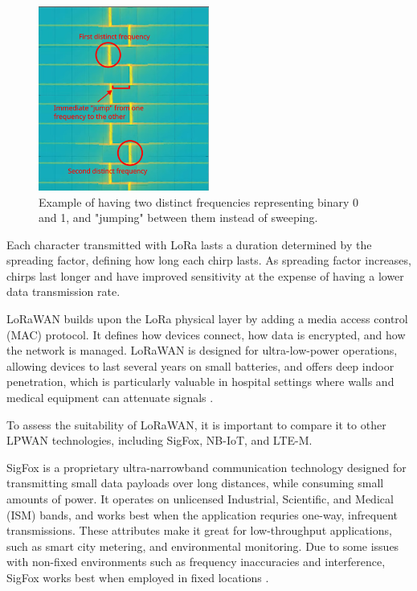 \begin{figure}[H]
\centering
\includegraphics[width=0.5\textwidth]{images/frequency_shift_keying_labeled.png}
\caption{Example of having two distinct frequencies representing binary 0 and 1, and "jumping" between them instead of sweeping. \cite{Wenner2017-hd}}
\label{fig:frequency_shift_keying_labeled}
\end{figure}

Each character transmitted with LoRa lasts a duration determined by the spreading factor, defining how long each chirp lasts. As spreading factor increases, chirps last longer and have improved sensitivity at the expense of having a lower data transmission rate.

LoRaWAN builds upon the LoRa physical layer by adding a media access control (MAC) protocol. It defines how devices connect, how data is encrypted, and how the network is managed. LoRaWAN is designed for ultra-low-power operations, allowing devices to last several years on small batteries, and offers deep indoor penetration, which is particularly valuable in hospital settings where walls and medical equipment can attenuate signals \cite{lora_documentation}.

To assess the suitability of LoRaWAN, it is important to compare it to other LPWAN technologies, including SigFox, NB-IoT, and LTE-M.

SigFox is a proprietary ultra-narrowband communication technology designed for transmitting small data payloads over long distances, while consuming small amounts of power. It operates on unlicensed Industrial, Scientific, and Medical (ISM) bands, and works best when the application requries one-way, infrequent transmissions. These attributes make it great for low-throughput applications, such as smart city metering, and environmental monitoring. Due to some issues with non-fixed environments such as frequency inaccuracies and interference, SigFox works best when employed in fixed locations \cite{sigfox_advantages_disadvantages}.

